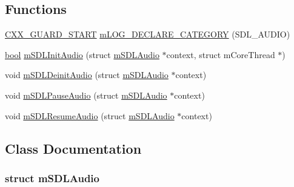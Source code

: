 \subsection*{Functions}
\begin{DoxyCompactItemize}
\item 
\mbox{\hyperlink{__builder_8h_af721f4bd9a2c3267a89d3967b3ca1747}{C\+X\+X\+\_\+\+G\+U\+A\+R\+D\+\_\+\+S\+T\+A\+RT}} \mbox{\hyperlink{sdl-audio_8h_a525ae29ba75d56661d43e2a0ba304774}{m\+L\+O\+G\+\_\+\+D\+E\+C\+L\+A\+R\+E\+\_\+\+C\+A\+T\+E\+G\+O\+RY}} (S\+D\+L\+\_\+\+A\+U\+D\+IO)
\item 
\mbox{\hyperlink{libretro_8h_a4a26dcae73fb7e1528214a068aca317e}{bool}} \mbox{\hyperlink{sdl-audio_8h_a1c75685e8415e4fe15ff64454b121d53}{m\+S\+D\+L\+Init\+Audio}} (struct \mbox{\hyperlink{sdl-audio_8h_structm_s_d_l_audio}{m\+S\+D\+L\+Audio}} $\ast$context, struct m\+Core\+Thread $\ast$)
\item 
void \mbox{\hyperlink{sdl-audio_8h_adadf9e93127f15bd0b8f6910f1b64628}{m\+S\+D\+L\+Deinit\+Audio}} (struct \mbox{\hyperlink{sdl-audio_8h_structm_s_d_l_audio}{m\+S\+D\+L\+Audio}} $\ast$context)
\item 
void \mbox{\hyperlink{sdl-audio_8h_a6fd4770ab1d4825f5f3231ce155d4696}{m\+S\+D\+L\+Pause\+Audio}} (struct \mbox{\hyperlink{sdl-audio_8h_structm_s_d_l_audio}{m\+S\+D\+L\+Audio}} $\ast$context)
\item 
void \mbox{\hyperlink{sdl-audio_8h_aec2e6fbd9b73db60bf1dee6113caeb03}{m\+S\+D\+L\+Resume\+Audio}} (struct \mbox{\hyperlink{sdl-audio_8h_structm_s_d_l_audio}{m\+S\+D\+L\+Audio}} $\ast$context)
\end{DoxyCompactItemize}


\subsection{Class Documentation}
\label{structm_s_d_l_audio}
\subsubsection{struct m\+S\+D\+L\+Audio}


